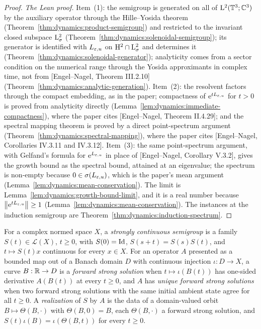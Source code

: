 \begin{proof}
  \emph{The Lean proof.}  Item~(1): the semigroup is generated on all of
  $\mathrm{L}^2(\mathbb{T}^3;\mathbb{C}^3)$ by the auxiliary operator through the Hille--Yosida theorem
  (Theorem~\ref{thm:dynamics:product-semigroup}) and restricted to the invariant closed
  subspace $\mathrm{L}^2_\sigma$ (Theorem~\ref{thm:dynamics:solenoidal-semigroup}); its generator is
  identified with $L_{\varepsilon,u}$ on $\mathrm{H}^2\cap\mathrm{L}^2_\sigma$ and determines it
  (Theorem~\ref{thm:dynamics:solenoidal-generator}); analyticity comes from a sector condition
  on the numerical range through the Yosida approximants in complex time, not from
  [Engel--Nagel, Theorem III.2.10] (Theorem~\ref{thm:dynamics:analytic-generation}).
  Item~(2): the resolvent factors through the compact embedding, as in the paper;
  compactness of $\mathrm{e}^{tL_{\varepsilon,u}}$ for $t>0$ is proved from analyticity directly
  (Lemma~\ref{lem:dynamics:immediate-compactness}), where the paper cites
  [Engel--Nagel, Theorem II.4.29]; and the spectral mapping theorem is proved by a direct
  point-spectrum argument (Theorem~\ref{thm:dynamics:spectral-mapping}), where the paper cites
  [Engel--Nagel, Corollaries IV.3.11 and IV.3.12].  Item~(3): the same point-spectrum argument,
  with Gelfand's formula for $\mathrm{e}^{L_{\varepsilon,u}}$ in place of [Engel--Nagel, Corollary V.3.2],
  gives the growth bound as the spectral bound, attained at an eigenvalue; the spectrum is
  non-empty because $0\in\sigma(L_{\varepsilon,u})$, which is the paper's mean argument
  (Lemma~\ref{lem:dynamics:mean-conservation}).  The limit is
  Lemma~\ref{lem:dynamics:growth-bound-limit}, and it is a real number because
  $\left\|\mathrm{e}^{tL_{\varepsilon,u}}\right\|\geq1$ (Lemma~\ref{lem:dynamics:mean-conservation}).  The instances
  at the induction semigroup are Theorem~\ref{thm:dynamics:induction-spectrum}.
\end{proof}

\begin{definition}
  \label{def:dynamics:semigroup-interface}
  \leanok
  For a complex normed space $X $, a \emph{strongly continuous semigroup} is a family
  $S(t)\in\mathcal L(X) $, $t\geq0 $, with $S(0)=\mathrm{Id} $,
  $S(s+t)=S(s)S(t) $, and $t\mapsto S(t)x $ continuous for every $x\in X $.  For an
  operator $A $ presented as a bounded map out of a Banach domain $D $ with continuous
  injection $\iota:D\to X $, a curve $B:\mathbb{R}\to D $ is a \emph{forward strong solution}
  when $t\mapsto\iota(B(t)) $ has one-sided derivative $A(B(t)) $ at every $t\geq0 $, and
  $A $ has \emph{unique forward strong solutions} when two forward strong solutions with
  the same initial ambient state agree for all $t\geq0 $.  A \emph{realization} of $S $ by
  $A $ is the data of a domain-valued orbit $B\mapsto\Theta(B,\cdot) $ with
  $\Theta(B,0)=B $, each $\Theta(B,\cdot) $ a forward strong solution, and
  $S(t)\iota(B)=\iota(\Theta(B,t)) $ for every $t\geq0 $.
\end{definition}


